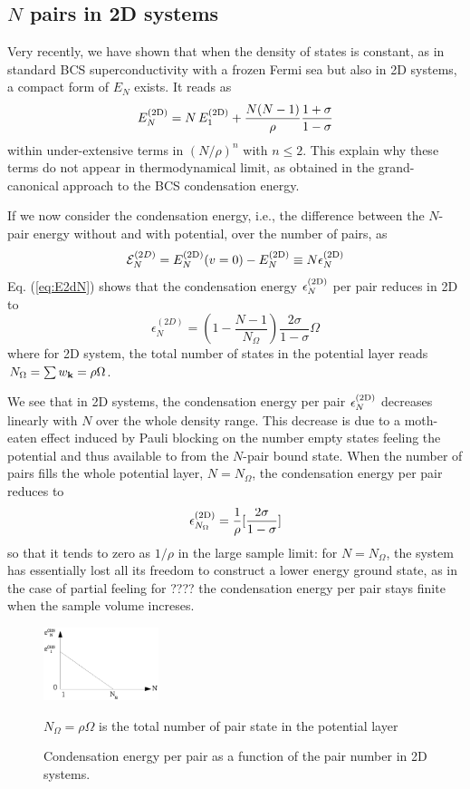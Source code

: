 \documentclass[aps,prb,showpacs,3p,twocolumn]{elsarticle}
\begin{document}
\subsection{$N$ pairs in 2D systems}
Very recently, we have shown that when the density of states is constant, as in standard BCS superconductivity with a frozen Fermi sea but also in 2D systems, a compact form of $E_N$ exists. It  reads as  
\begin{equation}\label{eq:E2dN}
 E^{{\text{(2D)}}}_N=N\,E^{{\text{(2D)}}}_1+\frac{N(N-1)}{\rho}\frac{1+\sigma}{1-\sigma}
\end{equation}
within under-extensive terms in $(N/\rho)^n$ with $n\leq2$. This explain why these terms do not appear in thermodynamical limit, as obtained in the grand-canonical approach to the BCS condensation energy. 

If we now consider the condensation energy, i.e., the difference between the $N$-pair energy without and with potential, over the number of pairs, as 
\begin{equation}
 \mathcal{E}^{(2D)}_N=E_N^{{{\text{(2D)}}}}(v=0)-E_N^{{\text{(2D)}}}\equiv{}N\epsilon_N^{{\text{(2D)}}}
 \end{equation}
 Eq. (\ref{eq:E2dN}) shows that the condensation energy $\epsilon_{N}^{{{\text{(2D)}}}}$ per pair reduces in 2D to
 \begin{equation}
\epsilon^{(2D)}_N=(1-\frac{N-1}{N_\Omega})\frac{2\sigma}{1-\sigma}\Omega\label{eq:E2D}
\end{equation}
where for 2D system, the total number of states in the potential layer reads $N_\Omega=\sum{}w_{\mathbf{k}}=\rho\Omega$. 

We see that in 2D systems, the condensation energy per pair $\epsilon^{{\text{(2D)}}}_N$  decreases linearly with $N$ over the whole density range. This decrease is due to a moth-eaten effect induced by Pauli blocking on the number empty states feeling the potential and thus available to from the $N$-pair bound state.  When the number of pairs fills the whole potential layer, $N=N_\Omega$, the condensation energy per pair reduces to 
\begin{equation}
 \epsilon^{{\text{(2D)}}}_{N_\Omega}=\frac{1}{\rho}[\frac{2\sigma}{1-\sigma}]
\end{equation}
so that it tends to zero as $1/\rho$ in the large sample limit: for $N=N_\Omega$, the system has  essentially lost all its freedom to construct a lower energy ground state, as in the case of partial feeling for ???? the condensation energy per pair stays finite when the sample volume increses.  


\begin{figure}[htbp]
	\centering
		\includegraphics[width=0.30\textwidth]{2dCondEnergy.eps}
	\caption{Condensation energy per pair as a function of the pair number in 2D systems.}
	$N_{\Omega}=\rho\Omega$ is the total number of pair state in the potential layer
	\label{fig:2dCondEnergy}
\end{figure}
\end{document}
